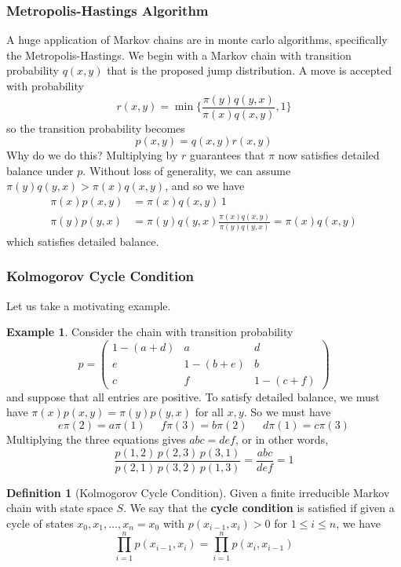 \documentclass{article}
\theoremstyle{definition}
\newtheorem{example}{Example}[section]
\theoremstyle{remark}
\theoremstyle{definition}
\newtheorem{definition}{Definition}[section]
\begin{document}
\subsubsection{Metropolis-Hastings Algorithm}

A huge application of Markov chains are in monte carlo algorithms, specifically the Metropolis-Hastings. We begin with a Markov chain with transition probability $q(x, y)$ that is the proposed jump distribution. A move is accepted with probability 
\[r(x, y) = \min\bigg\{ \frac{\pi(y) q(y, x)}{\pi(x) q(x, y)}, 1 \bigg\}\]
so the transition probability becomes 
\[p(x, y) = q(x, y) r(x, y)\]
Why do we do this? Multiplying by $r$ guarantees that $\pi$ now satisfies detailed balance under $p$. Without loss of generality, we can assume $\pi(y) q(y, x) > \pi(x) q(x, y)$, and so we have 
\begin{align*}
    \pi(x) p(x, y) & = \pi(x) q(x, y) \,1 \\
    \pi(y) p(y, x) & = \pi(y) q(y, x) \frac{\pi(x) q(x, y)}{\pi(y) q(y, x)} = \pi(x) q(x, y)
\end{align*}
which satisfies detailed balance. 

\subsubsection{Kolmogorov Cycle Condition}

Let us take a motivating example. 

\begin{example}
Consider the chain with transition probability 
\[p = \begin{pmatrix} 1 - (a + d) & a & d \\ e & 1 - (b + e) & b \\ c & f & 1 - (c + f) \end{pmatrix}\]
and suppose that all entries are positive. To satisfy detailed balance, we must have $\pi(x) p(x, y) = \pi(y) p(y, x)$ for all $x, y$. So we must have
\[e \pi(2) = a \pi(1) \;\;\;\;\; f \pi(3) = b \pi(2) \;\;\;\;\; d \pi(1) = c \pi(3)\]
Multiplying the three equations gives $abc = def$, or in other words, 
\[\frac{p(1, 2) \, p(2, 3) \, p(3, 1)}{p(2, 1)\, p(3, 2) \, p(1, 3)} = \frac{abc}{def} = 1\]
\end{example}

\begin{definition}[Kolmogorov Cycle Condition]
Given a finite irreducible Markov chain with state space $S$. We say that the \textbf{cycle condition} is satisfied if given a cycle of states $x_0, x_1, \ldots, x_n = x_0$ with $p(x_{i-1}, x_i) > 0$ for $1 \leq i \leq n$, we have 
\[\prod_{i=1}^n p(x_{i-1}, x_i) = \prod_{i=1}^n p(x_i, x_{i-1})\]
\end{definition}
\end{document}

